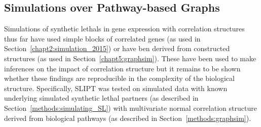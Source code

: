 



\subsection{Simulations over Pathway-based Graphs}

\FloatBarrier

Simulations of \glspl{synthetic lethal} in \gls{gene expression} with correlation structures thus far have used simple blocks of correlated genes (as used in Section~\ref{chapt2:simulation_2015}) or have ben derived from constructed  structures (as used in Section~\ref{chapt5:graphsim}). These have been used to make inferences on the impact of correlation structure but it remains to be shown whether these findings are reproducible in the complexity of the biological  structure. Specifically, \gls{SLIPT} was tested on simulated data with known underlying simulated \gls{synthetic lethal} partners (as described in Section~\ref{methods:simulating_SL}) with multivariate normal correlation structure derived from biological pathways (as described in Section~\ref{methods:graphsim}).


